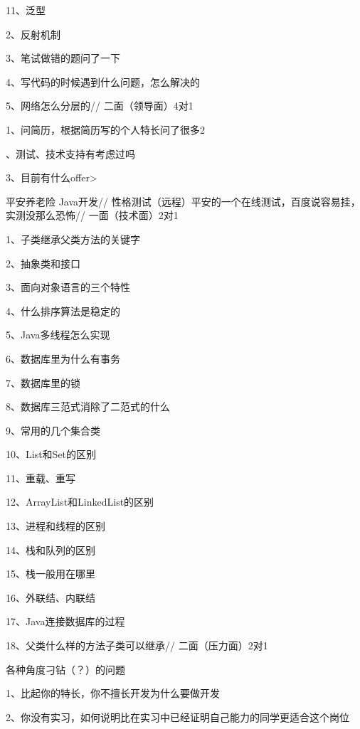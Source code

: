 \documentclass[UTF8]{ctexart}
\begin{document}
 11、泛型

 2、反射机制

 3、笔试做错的题问了一下

 4、写代码的时候遇到什么问题，怎么解决的

 5、网络怎么分层的// 二面（领导面）4对1

 1、问简历，根据简历写的个人特长问了很多2

 、测试、技术支持有考虑过吗

 3、目前有什么offer> 

 平安养老险 Java开发// 性格测试（远程）平安的一个在线测试，百度说容易挂，实测没那么恐怖// 一面（技术面）2对1

 1、子类继承父类方法的关键字

 2、抽象类和接口

 3、面向对象语言的三个特性

 4、什么排序算法是稳定的

 5、Java多线程怎么实现

 6、数据库里为什么有事务

 7、数据库里的锁

 8、数据库三范式消除了二范式的什么

 9、常用的几个集合类

 10、List和Set的区别

 11、重载、重写

 12、ArrayList和LinkedList的区别

 13、进程和线程的区别

 14、栈和队列的区别

 15、栈一般用在哪里

 16、外联结、内联结

 17、Java连接数据库的过程

 18、父类什么样的方法子类可以继承// 二面（压力面）2对1

 各种角度刁钻（？）的问题

 1、比起你的特长，你不擅长开发为什么要做开发

 2、你没有实习，如何说明比在实习中已经证明自己能力的同学更适合这个岗位





\end{document}
